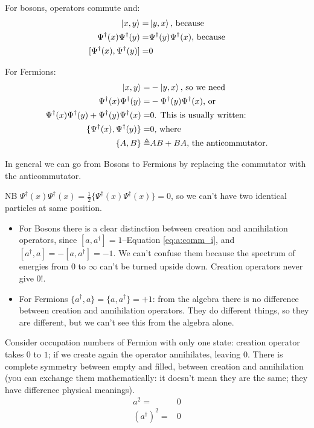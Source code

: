 \documentclass[]{article}
\begin{document}
For bosons, operators commute and:
\begin{align*}
	\ket{x,y}=&\ket{y,x} \text{, because}\\
	\Psi^\dagger(x)\Psi^\dagger(y)=&\Psi^\dagger(y)\Psi^\dagger(x) \text{, because}\\
	[\Psi^\dagger(x),\Psi^\dagger(y)]=&0
\end{align*}

For Fermions:
\begin{align*}
	\ket{x,y}=&-\ket{y,x} \text{, so we need}\\
	\Psi^\dagger(x)\Psi^\dagger(y)=& -\Psi^\dagger(y)\Psi^\dagger(x) \text{, or}\\
	\Psi^\dagger(x)\Psi^\dagger(y)+\Psi^\dagger(y)\Psi^\dagger(x)=&0 \text{. This is usually written:}\\
	\{\Psi^\dagger(x), \Psi^\dagger(y)\}=&0 \text{, where}\\
	\{A,B\}\triangleq& AB + BA \text{, the anticommutator.}
\end{align*}

In general we can go from Bosons to Fermions by replacing the commutator with the anticommutator.

NB  $\Psi^\dagger(x)\Psi^\dagger(x)=\frac{1}{2}\{\Psi^\dagger(x)\Psi^\dagger(x)\}=0$,  so we can't have two identical particles at same position.

\begin{itemize}
	\item For Bosons there is a clear distinction between creation and annihilation operators, since $[a,a^\dagger]=1$--Equation \eqref{eq:a:comm_i}, and $[a^\dagger,a]=-[a,a^\dagger]=-1$. We can't confuse them because the spectrum of energies from $0$ to $\infty$ can't be turned upside down. Creation operators never give 0!.
	\item For Fermions $\{a^\dagger,a\}= \{a,a^\dagger\}=+1$: from the algebra there is no difference between creation and annihilation operators. They do different things, so they are different, but we can't see this from the algebra alone.
\end{itemize}

Consider occupation numbers of Fermion with only one state: creation operator takes $0$ to $1$; if we create again the operator  annihilates, leaving $0$. There is complete symmetry between empty and filled, between creation and annihilation (you can exchange them mathematically: it doesn't mean they are the same; they have difference physical meanings).
\begin{align*}
	a^2=&0\\
	(a^\dagger)^2=&0
\end{align*}
\end{document}
